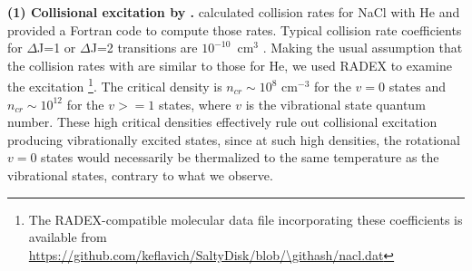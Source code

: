 \documentclass[12pt]{article}
\newcommand{\kms}{\textrm{km~s}\ensuremath{^{-1}}\xspace}	%
\newcommand{\percc}{\ensuremath{\textrm{cm}^{-3}}\xspace}
\begin{document}
\par{\textbf{(1) Collisional excitation by \hh.}} 
%
%
\cite{Quintana-Lacaci2016a} calculated collision rates for NaCl with He and
provided a Fortran code to compute those rates.  Typical collision rate
coefficients for \hbox{$\Delta$J=1} or \hbox{$\Delta$J=2} transitions are
$10^{-10}$~cm$^3$ \pers.  Making the usual assumption that the collision rates
with \hh are similar to those for He, we used RADEX \cite{van-der-Tak2007a} to
examine the excitation \footnote{The
RADEX-compatible molecular data
file incorporating these coefficients is available from
\url{https://github.com/keflavich/SaltyDisk/blob/\githash/nacl.dat}}.
The critical density is $n_{cr}\sim10^8$ \percc for the $v=0$
states and $n_{cr}\sim10^{12}$ for the $v>=1$ states, where $v$ is the
vibrational state quantum number.  These high critical densities effectively
rule out collisional excitation producing vibrationally excited states,
since at such high densities, the rotational $v=0$ states would necessarily
be thermalized to the same temperature as the vibrational states, contrary
to what we observe.
\end{document}
